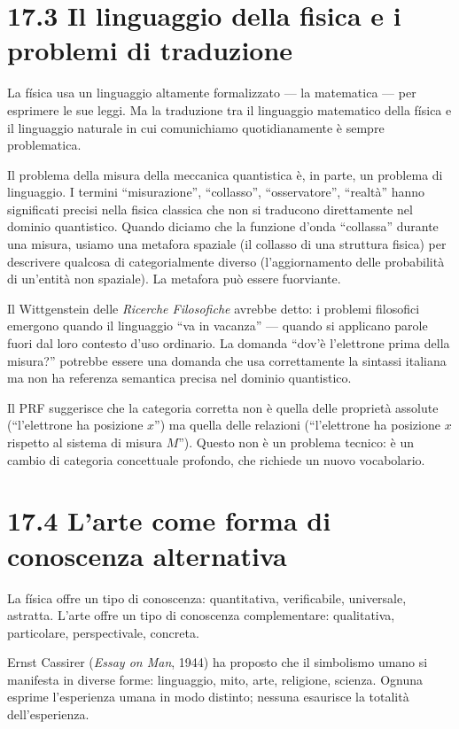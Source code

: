 \documentclass[11.5pt,a4paper,openany]{book}
\theoremstyle{remark}
\begin{document}
\section{17.3 Il linguaggio della fisica e i problemi di traduzione}

La física usa un linguaggio altamente formalizzato --- la matematica --- per esprimere le sue leggi. Ma la traduzione tra il linguaggio matematico della física e il linguaggio naturale in cui comunichiamo quotidianamente è sempre problematica.

Il problema della misura della meccanica quantistica è, in parte, un problema di linguaggio. I termini ``misurazione'', ``collasso'', ``osservatore'', ``realtà'' hanno significati precisi nella fisica classica che non si traducono direttamente nel dominio quantistico. Quando diciamo che la funzione d'onda ``collassa'' durante una misura, usiamo una metafora spaziale (il collasso di una struttura fisica) per descrivere qualcosa di categorialmente diverso (l'aggiornamento delle probabilità di un'entità non spaziale). La metafora può essere fuorviante.

Il Wittgenstein delle \textit{Ricerche Filosofiche} avrebbe detto: i problemi filosofici emergono quando il linguaggio ``va in vacanza'' --- quando si applicano parole fuori dal loro contesto d'uso ordinario. La domanda ``dov'è l'elettrone prima della misura?'' potrebbe essere una domanda che usa correttamente la sintassi italiana ma non ha referenza semantica precisa nel dominio quantistico.

Il PRF suggerisce che la categoria corretta non è quella delle proprietà assolute (``l'elettrone ha posizione $x$'') ma quella delle relazioni (``l'elettrone ha posizione $x$ rispetto al sistema di misura $M$''). Questo non è un problema tecnico: è un cambio di categoria concettuale profondo, che richiede un nuovo vocabolario.

\section{17.4 L'arte come forma di conoscenza alternativa}

La física offre un tipo di conoscenza: quantitativa, verificabile, universale, astratta. L'arte offre un tipo di conoscenza complementare: qualitativa, particolare, perspectivale, concreta.

Ernst Cassirer (\textit{Essay on Man}, 1944) ha proposto che il simbolismo umano si manifesta in diverse forme: linguaggio, mito, arte, religione, scienza. Ognuna esprime l'esperienza umana in modo distinto; nessuna esaurisce la totalità dell'esperienza.
\end{document}
